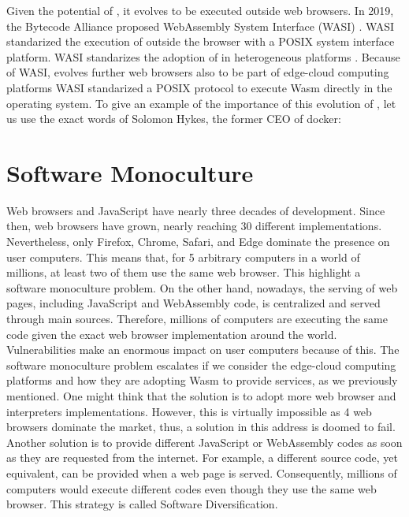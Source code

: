 Given the potential of \wasm, it evolves to be executed outside web browsers.
In 2019, the Bytecode Alliance \cite{bytecodealliance} proposed WebAssembly System Interface (WASI) \cite{WASI}. 
WASI standarized the execution of \wasm outside the browser with a POSIX system interface platform.
WASI standarizes the adoption of \wasm in heterogeneous platforms \cite{bryant2020webassembly}. 
Because of WASI, \wasm evolves further web browsers also to be part of edge-cloud computing platforms \cite{9640153, wen2020wasmachine}
WASI standarized a POSIX protocol to execute Wasm directly in the operating system. 
To give an example of the importance of this evolution of \wasm, let us use the exact words of Solomon Hykes, the former CEO of docker: 

\vspace{0.5cm}

\begin{minipage}{0.8\linewidth}
\end{minipage}

\section{Software Monoculture}

Web browsers and JavaScript have nearly three decades of development.
Since then, web browsers have grown, nearly reaching 30 different implementations. 
Nevertheless, only Firefox, Chrome, Safari, and Edge dominate the presence on user computers.
This means that, for 5 arbitrary computers in a world of millions, at least two of them use the same web browser.
This highlight a software monoculture problem.
On the other hand, nowadays, the serving of web pages, including JavaScript and WebAssembly code, is centralized and served through main sources.
Therefore, millions of computers are executing the same code given the exact web browser implementation around the world.
Vulnerabilities make an enormous impact on user computers because of this.
The software monoculture problem escalates if we consider the edge-cloud computing platforms and how they are adopting Wasm to provide services, as we previously mentioned.
One might think that the solution is to adopt more web browser and interpreters implementations. 
However, this is virtually impossible as 4 web browsers dominate the market, thus, a solution in this address is doomed to fail. 
Another solution is to provide different JavaScript or WebAssembly codes as soon as they are requested from the internet. 
For example, a different source code, yet equivalent, can be provided when a web page is served. 
Consequently, millions of computers would execute different codes even though they use the same web browser.
This strategy is called Software Diversification.

